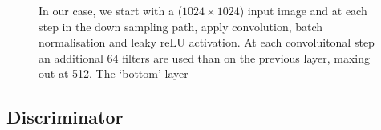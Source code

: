 \documentclass[11pt,a4paper,onecolumn]{report}
\begin{document}
  \begin{figure}
    \centering
    \caption{
      In our case, we start with a ($1024\times 1024$) input image and at each step
      in the down sampling path, apply convolution, batch normalisation and leaky
      reLU activation.%
      At each convoluitonal step an additional 64 filters are used than on the
      previous layer, maxing out at 512. The `bottom' layer 
    }
    \label{fig:gen_model}
  \end{figure}


  


\subsection{Discriminator}
\end{document}
